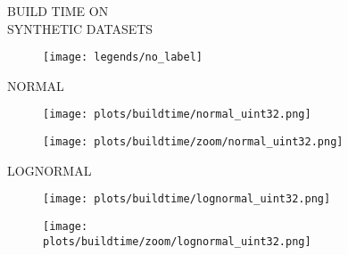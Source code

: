 \documentclass{article}
\begin{document}
\begin{figure}[!htbp]
\fbox
{
\begin{minipage}[t][0.98\textheight][t]{\textwidth}
\centering
\vspace*{-0.40cm}
    \begin{minipage}{0.2\linewidth}
    \footnotesize{BUILD TIME ON \\ SYNTHETIC DATASETS}
    \end{minipage}
   \begin{minipage}{0.75\linewidth}
        \begin{figure}[H]
        \texttt{[image: legends/no\_label]}
        \end{figure}
    \end{minipage}
    \vspace*{-18px}
    
    \begin{minipage}{0.03\linewidth}
    \begin{sideways}\small NORMAL\end{sideways}
    \end{minipage}
    \begin{minipage}{0.39\linewidth}
        \begin{figure}[H]
        \texttt{[image: plots/buildtime/normal\_uint32.png]}
        \end{figure}
    \end{minipage}
    \begin{minipage}{0.39\linewidth}
        \begin{figure}[H]
            \texttt{[image: plots/buildtime/zoom/normal\_uint32.png]}
        \end{figure}
    \end{minipage}
\vspace*{-0.6cm}

\begin{minipage}{0.03\linewidth}
    \begin{sideways}\small LOGNORMAL\end{sideways}
    \end{minipage}
    \begin{minipage}{0.39\linewidth}
        \begin{figure}[H]
        \texttt{[image: plots/buildtime/lognormal\_uint32.png]}
        \end{figure}
    \end{minipage}
    \begin{minipage}{0.39\linewidth}
        \begin{figure}[H]
            \texttt{[image: plots/buildtime/zoom/lognormal\_uint32.png]}
        \end{figure}
    \end{minipage}
\vspace*{-0.6cm}


\end{minipage}}
\end{figure}
\end{document}
